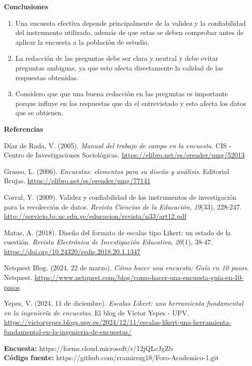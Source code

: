 \documentclass[12pt,letterpaper]{article}
\newcommand{\subtitulo}[1]{\noindent\textbf{#1}\par\vspace{2pt}}
\begin{document}
\subtitulo{Conclusiones}
\begin{enumerate}[label=\arabic*., left=0pt, itemsep=2pt]
\item Una encuesta efectiva depende principalmente de la validez y la confiabilidad del instrumento utilizado, además de que estas se deben comprobar antes de aplicar la encuesta a la población de estudio.
\item La redacción de las preguntas debe ser clara y neutral y debe evitar preguntas ambiguas, ya que esto afecta directamente la calidad de las respuestas obtenidas.
\item Considero que que una buena redacción en las preguntas es importante porque influye en las 
respuestas que da el entrevistado y esto afecta los datos que se obtienen.
\end{enumerate}

\subtitulo{Referencias}

\hangindent=1cm \noindent Díaz de Rada, V. (2005). \textit{Manual del trabajo de campo en la encuesta}. CIS - Centro de Investigaciones Sociológicas. \url{https://elibro.net/es/ereader/umg/52013}

\vspace{4pt}
\hangindent=1cm \noindent Grasso, L. (2006). \textit{Encuestas: elementos para su diseño y análisis}. Editorial Brujas. \url{https://elibro.net/es/ereader/umg/77141}

\vspace{4pt}
\hangindent=1cm \noindent Corral, Y. (2009). Validez y confiabilidad de los instrumentos de investigación para la recolección de datos. \textit{Revista Ciencias de la Educación}, \textit{19}(33), 228-247. \url{http://servicio.bc.uc.edu.ve/educacion/revista/n33/art12.pdf}

\vspace{4pt}
\hangindent=1cm \noindent Matas, A. (2018). Diseño del formato de escalas tipo Likert: un estado de la cuestión. \textit{Revista Electrónica de Investigación Educativa}, \textit{20}(1), 38-47. \url{https://doi.org/10.24320/redie.2018.20.1.1347}

\vspace{4pt}
\hangindent=1cm \noindent Netquest Blog. (2024, 22 de marzo). \textit{Cómo hacer una encuesta: Guía en 10 pasos}. Netquest. \url{https://www.netquest.com/blog/como-hacer-una-encuesta-guia-en-10-pasos}

\vspace{4pt}
\hangindent=1cm \noindent Yepes, V. (2024, 11 de diciembre). \textit{Escalas Likert: una herramienta fundamental en la ingeniería de encuestas}. El blog de Víctor Yepes - UPV. \url{https://victoryepes.blogs.upv.es/2024/12/11/escalas-likert-una-herramienta-fundamental-en-la-ingenieria-de-encuestas/}

\vspace{14pt}
\noindent\small \textbf{Encuesta:} https://forms.cloud.microsoft/r/12jQLcJgZb \\
\noindent\small \textbf{Código fuente:} https://github.com/rramirezg18/Foro-Academico-1.git
\end{document}

